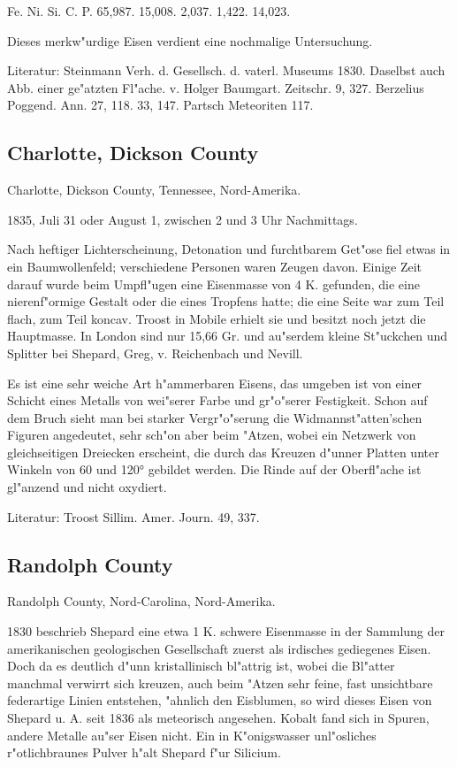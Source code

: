\documentclass[a4paper, 11pt, oneside]{article}
\begin{document}
Fe. Ni. Si. C. P.  
65,987. 15,008. 2,037. 1,422. 14,023.

Dieses merkw"urdige Eisen verdient eine nochmalige Untersuchung.

Literatur: Steinmann Verh. d. Gesellsch. d. vaterl. Museums 1830. Daselbst auch Abb. einer ge"atzten Fl"ache. v. Holger Baumgart. Zeitschr. 9, 327. Berzelius Poggend. Ann. 27, 118. 33, 147. Partsch Meteoriten 117.

\subsection{Charlotte, Dickson County}

Charlotte, Dickson County, Tennessee, Nord-Amerika.

1835, Juli 31 oder August 1, zwischen 2 und 3 Uhr Nachmittags.

Nach heftiger Lichterscheinung, Detonation und furchtbarem Get"ose fiel etwas in ein Baumwollenfeld; verschiedene Personen waren Zeugen davon. Einige Zeit darauf wurde beim Umpfl"ugen eine Eisenmasse von 4 K. gefunden, die eine nierenf"ormige Gestalt oder die eines Tropfens hatte; die eine Seite war zum Teil flach, zum Teil koncav. Troost in Mobile erhielt sie und besitzt noch jetzt die Hauptmasse. In London sind nur 15,66 Gr. und au"serdem kleine St"uckchen und Splitter bei Shepard, Greg, v. Reichenbach und Nevill.

Es ist eine sehr weiche Art h"ammerbaren Eisens, das umgeben ist von einer Schicht eines Metalls von wei"serer Farbe und gr"o"serer Festigkeit. Schon auf dem Bruch sieht man bei starker Vergr"o"serung die Widmannst"atten'schen Figuren angedeutet, sehr sch"on aber beim "Atzen, wobei ein Netzwerk von gleichseitigen Dreiecken erscheint, die durch das Kreuzen d"unner Platten unter Winkeln von 60 und 120° gebildet werden. Die Rinde auf der Oberfl"ache ist gl"anzend und nicht oxydiert.

Literatur: Troost Sillim. Amer. Journ. 49, 337.

\subsection{Randolph County}

Randolph County, Nord-Carolina, Nord-Amerika.

1830 beschrieb Shepard eine etwa 1 K. schwere Eisenmasse in der Sammlung der amerikanischen geologischen Gesellschaft zuerst als irdisches gediegenes Eisen. Doch da es deutlich d"unn kristallinisch bl"attrig ist, wobei die Bl"atter manchmal verwirrt sich kreuzen, auch beim "Atzen sehr feine, fast unsichtbare federartige Linien entstehen, "ahnlich den Eisblumen, so wird dieses Eisen von Shepard u. A. seit 1836 als meteorisch angesehen. Kobalt fand sich in Spuren, andere Metalle au"ser Eisen nicht. Ein in K"onigswasser unl"osliches r"otlichbraunes Pulver h"alt Shepard f"ur Silicium.
\end{document}
